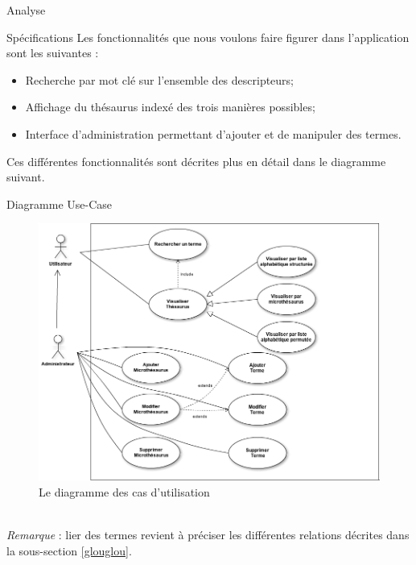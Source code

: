 \documentclass[a4paper, 12pt]{report}
\begin{document}
\begin{chapter}{Analyse}
	\begin{section}{Spécifications}
		Les fonctionnalités que nous voulons faire figurer dans l'application sont les suivantes :
		\begin{itemize}
			\item Recherche par mot clé sur l'ensemble des descripteurs;
			\item Affichage du thésaurus indexé des trois manières possibles;
			\item Interface d'administration permettant d'ajouter et de manipuler des termes.
		\end{itemize}
		
		Ces différentes fonctionnalités sont décrites plus en détail dans le diagramme suivant.
	\end{section}
	\begin{section}{Diagramme Use-Case}\label{re}
		\begin{figure}[h]
			\label{sucresale}
			\begin{center}
				\includegraphics[width=15cm]{Use-Case.png}
				\caption{Le diagramme des cas d'utilisation}
			\end{center}
		\end{figure}~\\
		
		\emph{Remarque} : lier des termes revient à préciser les différentes relations décrites dans la sous-section \ref{glouglou}.
	\end{section}
	

\end{chapter}
\end{document}
